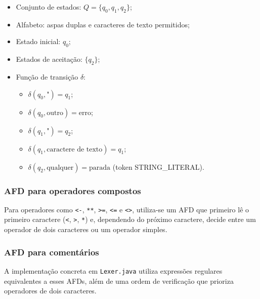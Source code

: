 \documentclass[12pt,a4paper]{article}
\begin{document}
\begin{itemize}
  \item Conjunto de estados: $Q = \{ q_0, q_1, q_2 \}$;
  \item Alfabeto: aspas duplas e caracteres de texto permitidos;
  \item Estado inicial: $q_0$;
  \item Estados de aceitação: $\{ q_2 \}$;
  \item Função de transição $\delta$:
  \begin{itemize}
    \item $\delta(q_0,\text{"}) = q_1$;
    \item $\delta(q_0,\text{outro}) = \text{erro}$;
    \item $\delta(q_1,\text{"}) = q_2$;
    \item $\delta(q_1,\text{caractere de texto}) = q_1$;
    \item $\delta(q_2,\text{qualquer}) = \text{parada}$ (token STRING\_LITERAL).
  \end{itemize}
\end{itemize}

\subsubsection*{AFD para operadores compostos}

Para operadores como \texttt{<-}, \texttt{**}, \texttt{>=}, \texttt{<=} e \texttt{<>}, utiliza-se um AFD que primeiro lê o primeiro caractere (\texttt{<}, \texttt{>}, \texttt{*}) e, dependendo do próximo caractere, decide entre um operador de dois caracteres ou um operador simples.

\subsubsection*{AFD para comentários}


A implementação concreta em \texttt{Lexer.java} utiliza expressões regulares equivalentes a esses AFDs, além de uma ordem de verificação que prioriza operadores de dois caracteres.
\end{document}
